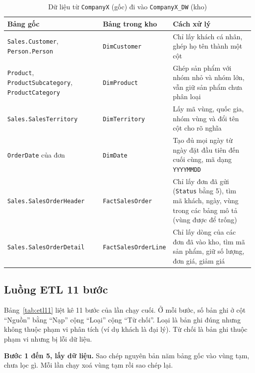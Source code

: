 \begin{table}[H]
\centering
\caption{Dữ liệu từ \texttt{CompanyX} (gốc) đi vào \texttt{CompanyX\_DW} (kho)}
\label{tab:anhxa}
\footnotesize
\begin{tabular}{p{3.8cm}p{3.0cm}p{7.6cm}}
\toprule
Bảng gốc & Bảng trong kho & Cách xử lý \\
\midrule
\texttt{Sales.Customer}, \texttt{Person.Person} & \texttt{DimCustomer} & Chỉ lấy khách cá nhân, ghép họ tên thành một cột \\
\texttt{Product}, \texttt{Product\allowbreak Subcategory}, \texttt{Product\allowbreak Category} & \texttt{DimProduct} & Ghép sản phẩm với nhóm nhỏ và nhóm lớn, vẫn giữ sản phẩm chưa phân loại \\
\texttt{Sales.SalesTerritory} & \texttt{DimTerritory} & Lấy mã vùng, quốc gia, nhóm vùng và đổi tên cột cho rõ nghĩa \\
\texttt{OrderDate} của đơn & \texttt{DimDate} & Tạo đủ mọi ngày từ ngày đặt đầu tiên đến cuối cùng, mã dạng \texttt{YYYYMMDD} \\
\texttt{Sales.\allowbreak SalesOrderHeader} & \texttt{Fact\allowbreak SalesOrder} & Chỉ lấy đơn đã gửi (\texttt{Status} bằng 5), tìm mã khách, ngày, vùng trong các bảng mô tả (vùng được để trống) \\
\texttt{Sales.\allowbreak SalesOrderDetail} & \texttt{Fact\allowbreak SalesOrderLine} & Chỉ lấy dòng của các đơn đã vào kho, tìm mã sản phẩm, giữ số lượng, đơn giá, giảm giá \\
\bottomrule
\end{tabular}
\end{table}

\subsection{Luồng ETL 11 bước}
Bảng~\ref{tab:etl11} liệt kê 11 bước của lần chạy cuối. Ở mỗi bước, số bản ghi ở cột ``Nguồn'' bằng ``Nạp'' cộng ``Loại'' cộng ``Từ chối''. Loại là bản ghi đúng nhưng không thuộc phạm vi phân tích (ví dụ khách là đại lý). Từ chối là bản ghi thuộc phạm vi nhưng bị lỗi dữ liệu.

\begin{table}[H]
\centering
\caption{Mười một bước của lần chạy ETL cuối}
\label{tab:etl11}
\footnotesize
{\setlength{\tabcolsep}{3.5pt}}
\end{table}

\textbf{Bước 1 đến 5, lấy dữ liệu.} Sao chép nguyên bản năm bảng gốc vào vùng tạm, chưa lọc gì. Mỗi lần chạy xoá vùng tạm rồi sao chép lại.

